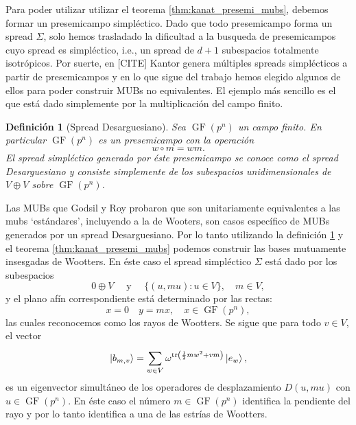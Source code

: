 \documentclass[a4paper]{report}
\DeclareMathOperator{\tr}{tr}
\DeclareMathOperator{\GF}{GF}
\newtheorem{definition}{Definición}
\begin{document}
  Para poder utilizar utilizar el teorema
  \ref{thm:kanat_presemi_mubs}, debemos formar un
  presemicampo simpléctico. Dado que todo presemicampo forma
  un spread $\Sigma$, solo hemos trasladado la dificultad a
  la busqueda de presemicampos cuyo spread es simpléctico,
  i.e., un spread de $d+1$ subespacios totalmente
  isotrópicos. Por suerte, en [CITE] Kantor genera múltiples
  spreads simplécticos a partir de presemicampos y en lo que
  sigue del trabajo hemos elegido algunos de ellos para
  poder construir MUBs no equivalentes. El ejemplo más
  sencillo es el que está dado simplemente por la
  multiplicación del campo finito.
  \begin{definition}[Spread Desarguesiano]
    \label{def:desarguesian_semifield}
    Sea $\GF(p^{n})$ un campo finito. En particular
    $\GF(p^{n})$ es un presemicampo con la operación
    \begin{equation}
      w \circ m = w m.
    \end{equation}
    El spread simpléctico generado por éste presemicampo
    se conoce como el spread Desarguesiano y consiste
    simplemente de los subespacios unidimensionales de $V
    \oplus V$ sobre $\GF(p^{n})$.
  \end{definition}
  Las MUBs que Godsil y Roy probaron que son unitariamente
  equivalentes a las mubs `estándares', incluyendo a la de
  Wooters, son casos específico de MUBs generados por un
  spread Desarguesiano. Por lo tanto utilizando la
  definición \ref{def:desarguesian_semifield} y el teorema
  \ref{thm:kanat_presemi_mubs} podemos construir las bases
  mutuamente insesgadas de Wootters. En éste caso el spread
  simpléctico $\Sigma$ está dado por los subespacios
  \begin{equation}
    0 \oplus V
    \quad \text{ y } \quad
    \{(u,mu) : u \in V\},
    \quad m \in V,
  \end{equation}
  y el plano afín correspondiente está determinado por las
  rectas:
  \begin{equation}
    x = 0
    \quad
    y = mx,
    \quad
    x \in \GF(p^{n}),
  \end{equation}
  las cuales reconocemos como los rayos de Wootters. Se
  sigue que para todo $v \in V$, el vector
  \begin{equation}
    \ket{b_{m,v}}
    = \sum_{w \in V}^{} \omega^{\tr\left( \frac{1}{2} m w^2
    + v m\right) } \ket{e_w},
  \end{equation} 
  es un eigenvector simultáneo de los operadores de
  desplazamiento $D(u,mu)$ con $u \in \GF(p^{n})$. En éste
  caso el número $m \in \GF(p^{n})$ identifica la pendiente
  del rayo y por lo tanto identifica a una de las estrías de
  Wootters.
\end{document}
